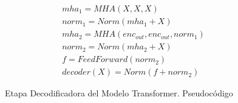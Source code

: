 \begin{figure}[ht!]
\begin{minipage}{.5\textwidth}
        \begin{equation*}
            \begin{split}
                mha_1 = MHA(X, X, X)\\
                norm_1 = Norm( mha_1 + X)\\
                mha_2 = MHA(enc_{out}, enc_{out}, norm_1)\\
                norm_2 = Norm( mha_2 + X)\\
                f = FeedForward(norm_2)\\
                decoder(X) = Norm(f + norm_2)
            \end{split}
            \label{eq:trans_dec}
        \end{equation*}
    \end{minipage}
    \caption{Etapa Decodificadora del Modelo Transformer. Pseudocódigo}
    \label{fig:trans_decoder}
\end{figure}


